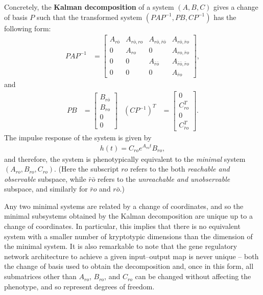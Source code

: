 \documentclass{article}
\newcommand{\ro}{{ro}}
\newcommand{\nro}{{\bar{r}o}}
\newcommand{\rno}{{r\bar{o}}}
\newcommand{\nrno}{{\bar{r}\bar{o}}}
\newcommand{\1}{\mathbbm{1}}
\begin{document}
Concretely, the \textbf{Kalman decomposition} of a system $(A,B,C)$  
gives a change of basis $P$ such that
the transformed system $(PAP^{-1},PB,CP^{-1})$  has the following form:
\begin{align*}
       PAP^{-1}
       &=
       \left[ \begin{array}{cccc}
           A_{\rno} & A_{\rno,\ro} & A_{\rno,\nrno} & A_{\rno,\nro} \\
           0 & A_{\ro} & 0 & A_{\ro,\nro} \\
           0 & 0 & A_{\nrno} & A_{\nrno,\nro} \\
          0 & 0 & 0 & A_{\nro}
       \end{array} \right] ,
\end{align*}
and
\begin{align*}
     PB
     &=
    \left[ \begin{array}{cccc}
         B_{\rno} \\
         B_{\ro} \\
         0 \\
         0 
   \end{array} \right] 
   &
   (CP^{-1})^T
   &=
   \left[ \begin{array}{cccc}
       0 \\
       C_{\ro}^T \\
       0 \\
       C_{\nro}^T
   \end{array} \right] .
\end{align*}
The impulse response of the system is given by
\begin{align*}
      h(t) = C_{\ro} e^{A_{\ro} t} B_{\ro},
\end{align*}
and therefore, the system is phenotypically equivalent to the \emph{minimal} system $(A_{\ro}, B_{\ro}, C_{\ro})$.
(Here the subscript $\ro$ refers to the both \emph{reachable and observable} subspace,
while $\nrno$ refers to the \emph{unreachable and unobservable} subspace,
and similarly for $\nro$ and $\rno$.)

Any two minimal systems are related by a change of coordinates,
and so the minimal subsystems obtained by the Kalman decomposition
are unique up to a change of coordinates.
In particular, this implies that there is no equivalent system with a smaller number of kryptotypic dimensions
than the dimension of the minimal system.
It is also remarkable to note that the gene regulatory network architecture to achieve a given input--output map is never unique --
both the change of basis used to obtain the decomposition
and, once in this form, all submatrices other than $A_{\ro}$, $B_{\ro}$, and $C_{\ro}$ can be changed without affecting the phenotype,
and so represent degrees of freedom.
\end{document}
